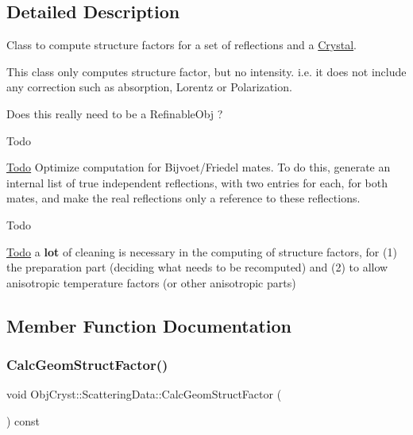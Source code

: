 \subsection{Detailed Description}
Class to compute structure factors for a set of reflections and a \mbox{\hyperlink{class_obj_cryst_1_1_crystal}{Crystal}}. 

This class only computes structure factor, but no intensity. i.\+e. it does not include any correction such as absorption, Lorentz or Polarization.

Does this really need to be a Refinable\+Obj ? \begin{DoxyRefDesc}{Todo}
\item[\mbox{\hyperlink{todo__todo000009}{Todo}}]Optimize computation for Bijvoet/\+Friedel mates. To do this, generate an internal list of \textquotesingle{}true independent reflections\textquotesingle{}, with two entries for each, for both mates, and make the \textquotesingle{}real\textquotesingle{} reflections only a reference to these reflections.\end{DoxyRefDesc}


\begin{DoxyRefDesc}{Todo}
\item[\mbox{\hyperlink{todo__todo000010}{Todo}}]a {\bfseries{lot}} of cleaning is necessary in the computing of structure factors, for (1) the \textquotesingle{}preparation\textquotesingle{} part (deciding what needs to be recomputed) and (2) to allow anisotropic temperature factors (or other anisotropic parts) \end{DoxyRefDesc}


\subsection{Member Function Documentation}
\mbox{\label{class_obj_cryst_1_1_scattering_data_a1b0237b27cf0e5a3fef7dba65113504e}} 
\subsubsection{\texorpdfstring{CalcGeomStructFactor()}{CalcGeomStructFactor()}}
{\footnotesize\ttfamily void Obj\+Cryst\+::\+Scattering\+Data\+::\+Calc\+Geom\+Struct\+Factor (\begin{DoxyParamCaption}{ }\end{DoxyParamCaption}) const\hspace{0.3cm}{\ttfamily [protected]}}



